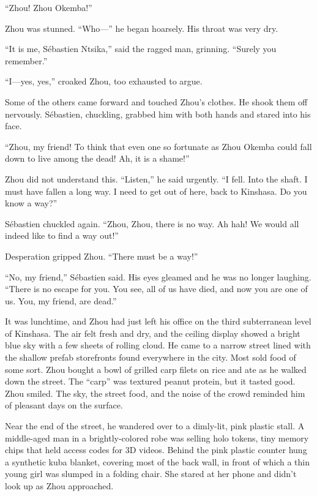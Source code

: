 \documentclass[10pt,b5paper]{article}
\begin{document}
``Zhou! Zhou Okemba!''

Zhou was stunned. ``Who---'' he began hoarsely. His throat was very dry.

``It is me, S\'{e}bastien Ntsika,'' said the ragged man, grinning. ``Surely
you remember.''

``I---yes, yes,'' croaked Zhou, too exhausted to argue.

Some of the others came forward and touched Zhou's clothes. He
shook them off nervously. S\'{e}bastien, chuckling, grabbed him with
both hands and stared into his face.

``Zhou, my friend! To think that even one so fortunate as Zhou Okemba
could fall down to live among the dead! Ah, it is a shame!''

Zhou did not understand this. ``Listen,'' he said urgently.
``I fell. Into the shaft. I must have fallen a long way. I need to
get out of here, back to Kinshasa. Do you know a way?''

S\'{e}bastien chuckled again. ``Zhou, Zhou, there is no way. Ah hah! We
would all indeed like to find a way out!''

Desperation gripped Zhou. ``There must be a way!''

``No, my friend,'' S\'{e}bastien said. His eyes gleamed and he was no
longer laughing. ``There is no escape for you. You see, all of us
have died, and now you are one of us. You, my friend, are dead.''

\bigskip

It was lunchtime, and Zhou had just left his office on the third
subterranean level of Kinshasa. The air felt fresh and dry, and the
ceiling display showed a bright blue sky with a few sheets of rolling
cloud. He came to a narrow street lined with the shallow prefab
storefronts found everywhere in the city. Most sold food of some
sort. Zhou bought a bowl of grilled carp filets on rice and ate as
he walked down the street. The ``carp'' was textured peanut protein,
but it tasted good. Zhou smiled. The sky, the street food, and the
noise of the crowd reminded him of pleasant days on the surface.

Near the end of the street, he wandered over to a dimly-lit, pink
plastic stall. A middle-aged man in a brightly-colored robe was
selling holo tokens, tiny memory chips that held access codes for
3D videos. Behind the pink plastic counter hung a synthetic kuba
blanket, covering most of the back wall, in front of which a thin
young girl was slumped in a folding chair. She stared at her phone
and didn't look up as Zhou approached.
\end{document}
